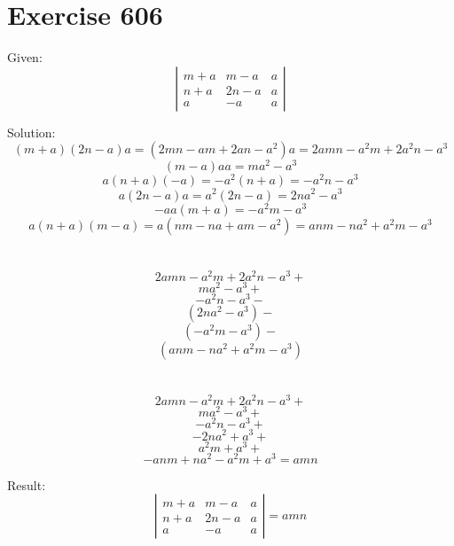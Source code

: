 \documentclass[a4paper, 10pt]{scrartcl}
\begin{document}
\section{Exercise 606}

Given:
\[
\left|
    \begin{array}{ccc}
    m + a & m - a & a\\
    n + a & 2n - a & a\\
    a & -a & a
    \end{array}
\right|
\]

Solution:
\[
(m + a)(2n - a)a = (2mn - am + 2an - a^{2})a = 2amn - a^{2}m + 2a^{2}n - a^{3}
\]
\[
(m - a)aa = ma^{2} - a^{3}
\]
\[
a(n + a)(-a) = -a^{2}(n + a) = -a^{2}n - a^{3}
\]
\[
a(2n - a)a = a^{2}(2n - a) = 2na^{2} - a^{3}
\]
\[
-aa(m + a) = -a^{2}m - a^{3}
\]
\[
a(n + a)(m - a) = a(nm - na + am - a^{2}) = anm - na^{2} + a^{2}m - a^{3}
\]
\\
\\
\[
2amn - a^{2}m + 2a^{2}n - a^{3} +
\]
\[
ma^{2} - a^{3} +
\]
\[
-a^{2}n - a^{3} -
\]
\[
(2na^{2} - a^{3}) -
\]
\[
(-a^{2}m - a^{3}) -
\]
\[
(anm - na^{2} + a^{2}m - a^{3})
\]
\\
\\
\[
2amn - a^{2}m + 2a^{2}n - a^{3} +
\]
\[
ma^{2} - a^{3} +
\]
\[
-a^{2}n - a^{3} +
\]
\[
-2na^{2} + a^{3} +
\]
\[
a^{2}m + a^{3} +
\]
\[
-anm + na^{2} - a^{2}m + a^{3} = amn
\]

Result:
\[
\left|
    \begin{array}{ccc}
    m + a & m - a & a\\
    n + a & 2n - a & a\\
    a & -a & a
    \end{array}
\right| = amn
\]
\end{document}
